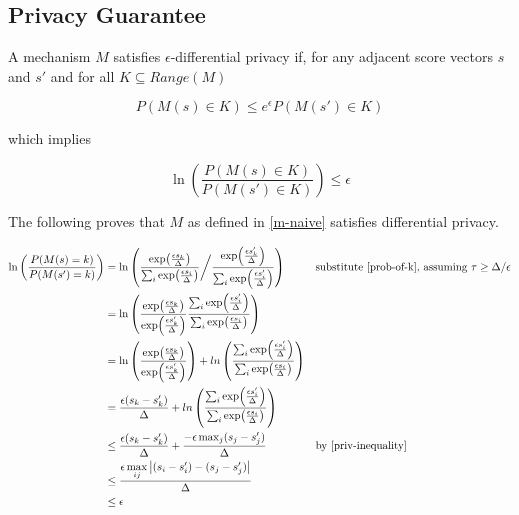 \documentclass{article}
\begin{document}
\subsection{Privacy Guarantee}
\label{privacy-guarantee}
A mechanism $M$ satisfies $\epsilon$-differential privacy if, for any adjacent score vectors $s$ and $s'$ and for all $K \subseteq Range(M)$

\begin{equation}
    P(M(s) \in K) \leq e^\epsilon P(M(s') \in K)
\end{equation}

which implies

\begin{equation}
    \label{ln-defn}
    \ln\left(\frac{P(M(s) \in K)}{P(M(s') \in K)}\right)  \leq \epsilon
\end{equation}

The following proves that $M$ as defined in \ref{m-naive} satisfies differential privacy.

\begin{align*}
    \ln\left(\frac{P(M(s) = k)}{P(M(s') = k)}\right) &= \ln \left(
        \frac
            {\exp(\frac{\epsilon s_k}{\Delta})}
            {\sum_{i} \exp(\frac{\epsilon s_i}{\Delta})
        }
        \bigg/ \frac
            {\exp(\frac{\epsilon s'_k}{\Delta})}
            {\sum_{i} \exp(\frac{\epsilon s'_i}{\Delta})} \right)
        &&\text{substitute \ref{prob-of-k}, assuming } \tau \geq \Delta / \epsilon \\
    &= \ln \left(\frac
        {\exp(\frac{\epsilon s_k}{\Delta})}{\exp(\frac{\epsilon s'_k}{\Delta})}
        \frac{\sum_{i} \exp(\frac{\epsilon s'_i}{\Delta})}{\sum_{i} \exp(\frac{\epsilon s_i}{\Delta})}\right) \\
    &= \ln \left(\frac
        {\exp(\frac{\epsilon s_k}{\Delta})}{\exp(\frac{\epsilon s'_k}{\Delta})}\right) + ln \left(
        \frac{\sum_{i} \exp(\frac{\epsilon s'_i}{\Delta})}{\sum_{i} \exp(\frac{\epsilon s_i}{\Delta})}\right) \\
    &= \frac{\epsilon (s_k - s'_k)}{\Delta} 
        + ln\left(\frac{\sum_{i} \exp(\frac{\epsilon s'_i}{\Delta})}{\sum_{i} \exp(\frac{\epsilon s_i}{\Delta})}\right) \\
    &\leq \frac{\epsilon (s_k - s'_k)}{\Delta} + \frac{-\epsilon \max_j (s_j - s'_j)}{\Delta} &&\text{by \ref{priv-inequality}} \\
    &\leq \frac{\epsilon\max\limits_{ij} \abs{(s_i - s'_i) - (s_j - s'_j)}}{\Delta} \\
    &\leq \epsilon
\end{align*}
\end{document}
